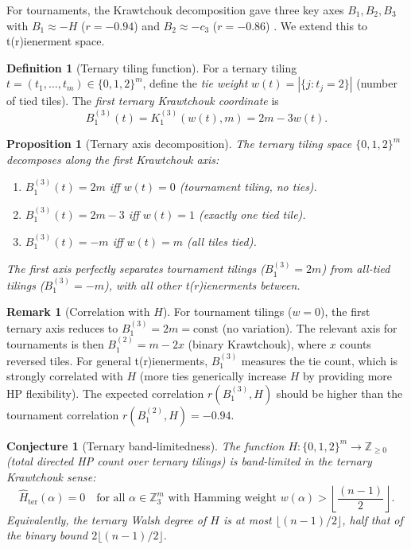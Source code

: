 \documentclass[12pt,reqno]{amsart}
\newtheorem{proposition}[theorem]{Proposition}
\theoremstyle{definition}
\newtheorem{definition}[theorem]{Definition}
\newtheorem{remark}[theorem]{Remark}
\theoremstyle{plain}
\newtheorem{conjecture}[theorem]{Conjecture}
\begin{document}
For tournaments, the Krawtchouk decomposition gave three key axes
$B_1,B_2,B_3$ with $B_1\approx -H$ ($r=-0.94$) and $B_2\approx -c_3$ ($r=-0.86$)
\cite{Cassidy2026}.  We extend this to t(r)ienerment space.

\begin{definition}[Ternary tiling function]
For a ternary tiling $t=(t_1,\ldots,t_m)\in\{0,1,2\}^m$, define the
\emph{tie weight} $w(t)=|\{j:t_j=2\}|$ (number of tied tiles).
The \emph{first ternary Krawtchouk coordinate} is
\[
  B_1^{(3)}(t)=K_1^{(3)}(w(t),m)=2m-3w(t).
\]
\end{definition}

\begin{proposition}[Ternary axis decomposition]
The ternary tiling space $\{0,1,2\}^m$ decomposes along the first Krawtchouk
axis:
\begin{enumerate}
\item $B_1^{(3)}(t)=2m$ iff $w(t)=0$ (tournament tiling, no ties).
\item $B_1^{(3)}(t)=2m-3$ iff $w(t)=1$ (exactly one tied tile).
\item $B_1^{(3)}(t)=-m$ iff $w(t)=m$ (all tiles tied).
\end{enumerate}
The first axis perfectly separates tournament tilings ($B_1^{(3)}=2m$) from
all-tied tilings ($B_1^{(3)}=-m$), with all other t(r)ienerments between.
\end{proposition}

\begin{remark}[Correlation with $H$]
For tournament tilings ($w=0$), the first ternary axis reduces to
$B_1^{(3)}=2m=\mathrm{const}$ (no variation).
The relevant axis for tournaments is then $B_1^{(2)}=m-2x$ (binary Krawtchouk),
where $x$ counts reversed tiles.
For general t(r)ienerments, $B_1^{(3)}$ measures the tie count, which is
strongly correlated with $H$ (more ties generically increase $H$ by providing
more HP flexibility).  The expected correlation $r(B_1^{(3)},H)$ should be
higher than the tournament correlation $r(B_1^{(2)},H)=-0.94$.
\end{remark}

\begin{conjecture}[Ternary band-limitedness]\label{conj:band-limit}
The function $H:\{0,1,2\}^m\to\mathbb{Z}_{\ge 0}$ (total directed HP count
over ternary tilings) is band-limited in the ternary Krawtchouk sense:
\[
  \hat{H}_{\mathrm{ter}}(\alpha)=0\quad\text{for all }\alpha\in\mathbb{Z}_3^m
  \text{ with Hamming weight }w(\alpha)>\left\lfloor\frac{(n-1)}{2}\right\rfloor.
\]
Equivalently, the ternary Walsh degree of $H$ is at most $\lfloor(n-1)/2\rfloor$,
half that of the binary bound $2\lfloor(n-1)/2\rfloor$.
\end{conjecture}
\end{document}
